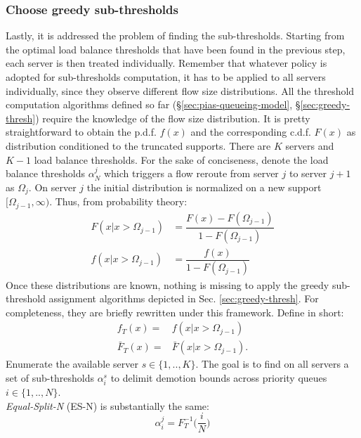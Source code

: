 \subsubsection{Choose greedy sub-thresholds}
\label{sec:subthresh-with-sd}
Lastly, it is addressed the problem of finding the sub-thresholds. Starting from the optimal load balance thresholds that have been found in the previous step, each server is then treated individually. Remember that whatever policy is adopted for sub-thresholds computation, it has to be applied to all servers individually, since they observe different flow size distributions. All the threshold computation algorithms defined so far (\S \ref{sec:pias-queueing-model}, \S \ref{sec:greedy-thresh}) require the knowledge of the flow size distribution. It is pretty straightforward to obtain the p.d.f. $f(x)$ and the corresponding c.d.f. $F(x)$ as distribution conditioned to the truncated supports. There are $K$ servers and $K-1$ load balance thresholds. For the sake of conciseness, denote the load balance thresholds $\alpha_N^j$ which triggers a flow reroute from server $j$ to server $j+1$ as $\Omega_j$. On server $j$ the initial distribution is normalized on a new support $[\Omega_{j-1},\infty)$. Thus, from probability theory:
\begin{equation}
\label{eq:conditionalpdf}
\begin{aligned}
F(x|x>\Omega_{j-1}) &= \dfrac{F(x) - F(\Omega_{j-1})}{1-F(\Omega_{j-1})}  \\
f(x|x>\Omega_{j-1}) &= \dfrac{f(x)}{1-F(\Omega_{j-1})} 
\end{aligned}
\end{equation}
Once these distributions are known, nothing is missing to apply the greedy sub-threshold assignment algorithms depicted in Sec. \ref{sec:greedy-thresh}. For completeness, they are briefly rewritten under this framework. Define in short:
\begin{align*}
f_T(x) =& f(x|x>\Omega_{j-1})\\
\bar{F}_T(x) =& \bar{F}(x|x>\Omega_{j-1}). 
\end{align*}
Enumerate the available server $s \in \{1,..,K\}$. The goal is to find on all servers a set of sub-thresholds $\alpha_i^s$ to delimit demotion bounds across priority queues $i \in \{1,..,N\}$. \\
\textit{Equal-Split-N} (ES-N) is substantially the same:
\begin{equation}
\alpha_i^j = F_T^{-1}\Big(\frac{i}{N}\Big)
\end{equation}
